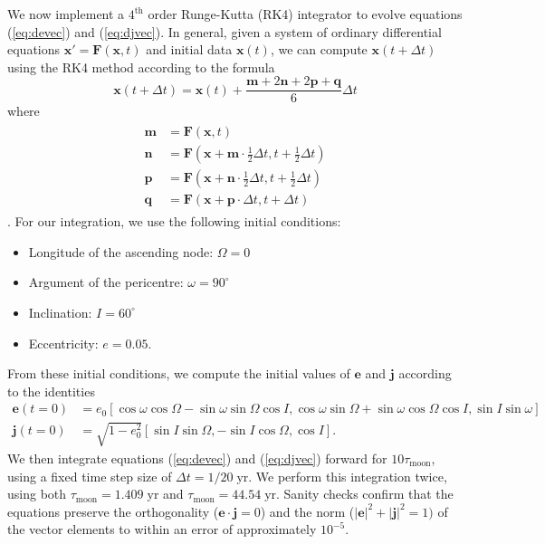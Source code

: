 \documentclass[11pt]{article}
\newcommand{\evec}{\mathbf{e}}
\newcommand{\jvec}{\mathbf{j}}
\newcommand{\xvec}{\mathbf{x}}
\begin{document}
We now implement a $4^\mathrm{th}$ order Runge-Kutta (RK4) integrator to evolve equations (\ref{eq:devec}) and (\ref{eq:djvec}). In general, given a system of ordinary differential equations $\xvec' = \mathbf{F}(\xvec, t)$ and initial data $\xvec(t)$, we can compute $\xvec(t + \Delta t)$ using the RK4 method according to the formula
\begin{equation} \label{eq:RK4}
    \xvec(t + \Delta t) = \xvec(t) + \frac{\mathbf{m} + 2\mathbf{n} + 2\mathbf{p} + \mathbf{q}}{6} \Delta t
\end{equation}
where
\begin{align}
\begin{split} \label{eq:RK4_derivatives}
    \mathbf{m} &= \mathbf{F} \left( \xvec, t \right) \\
    \mathbf{n} &= \mathbf{F} \left( \xvec + \textbf{m} \cdot \tfrac{1}{2} \Delta t, t + \tfrac{1}{2} \Delta t \right) \\
    \mathbf{p} &= \mathbf{F} \left( \xvec + \textbf{n} \cdot \tfrac{1}{2} \Delta t, t + \tfrac{1}{2} \Delta t \right) \\
    \mathbf{q} &= \mathbf{F} \left( \xvec + \textbf{p} \cdot \Delta t, t + \Delta t \right)
\end{split}
\end{align}
\parencite{hirsch2013}. For our integration, we use the following initial conditions:
\begin{itemize}
    \item Longitude of the ascending node: $\Omega = 0$
    \item Argument of the pericentre: $\omega = 90^\circ$
    \item Inclination: $I = 60^\circ$
    \item Eccentricity: $e = 0.05$.
\end{itemize}
From these initial conditions, we compute the initial values of $\evec$ and $\jvec$ according to the identities
\begin{align}
    \evec(t=0) &= e_0 [\cos \omega \cos \Omega - \sin \omega \sin \Omega \cos I, \cos \omega \sin \Omega + \sin \omega \cos \Omega \cos I, \sin I \sin \omega] \label{evec_elements} \\
    \jvec(t=0) &= \sqrt{1 - e_0^2}[\sin I \sin \Omega, -\sin I \cos \Omega, \cos I] \label{jvec_elements}.
\end{align}
We then integrate equations (\ref{eq:devec}) and (\ref{eq:djvec}) forward for $10 \tau_\mathrm{moon}$, using a fixed time step size of $\Delta t = 1/20 \; \mathrm{yr}$. We perform this integration twice, using both $\tau_{\mathrm{moon}} = 1.409 \; \mathrm{yr}$ and $\tau_{\mathrm{moon}} = 44.54 \; \mathrm{yr}$. Sanity checks confirm that the equations preserve the orthogonality ($\evec \cdot \jvec = 0$) and the norm ($|\evec|^2 + |\jvec|^2 = 1)$ of the vector elements to within an error of approximately $10^{-5}$.
\end{document}

